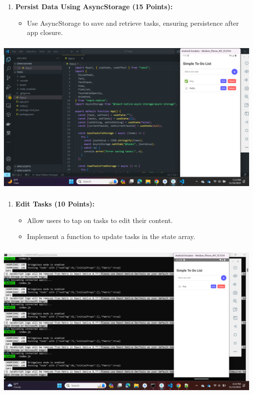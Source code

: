 \documentclass{article}
\begin{document}
\begin{enumerate}
    \item \textbf{Persist Data Using AsyncStorage (15 Points):}
    \begin{itemize}
        \item Use AsyncStorage to save and retrieve tasks, ensuring persistence after app closure.
    \end{itemize}
\end{enumerate}
\includegraphics[width=5.57813in,height=3.13391in]{media/image23.png}

\begin{enumerate}
    \item \textbf{Edit Tasks (10 Points):}
    \begin{itemize}
        \item Allow users to tap on tasks to edit their content.
        \item Implement a function to update tasks in the state array.
    \end{itemize}
\end{enumerate}
\includegraphics[width=5.57813in,height=3.13391in]{media/image11.png}
\end{document}
